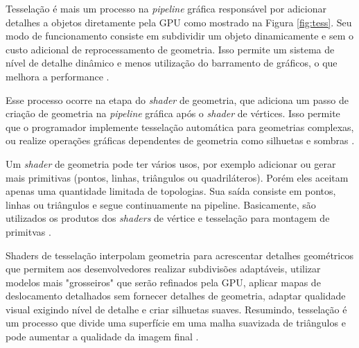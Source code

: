 Tesselação é mais um processo na \textit{pipeline} gráfica responsável por adicionar detalhes a objetos diretamente pela GPU como mostrado na Figura \ref{fig:tess}. Seu modo de funcionamento consiste em subdividir um objeto dinamicamente e sem o custo adicional de reprocessamento de geometria. Isso permite um sistema de nível de detalhe dinâmico e menos utilização do barramento de gráficos, o que melhora a performance \cite{HLSLBook}.

\begin{figure}[h!]
	\centering
\end{figure}
\nocite{tesselation}

Esse processo ocorre na etapa do \textit{shader} de geometria, que adiciona um passo de criação de geometria na \textit{pipeline} gráfica após o \textit{shader} de vértices. Isso permite que o programador implemente tesselação automática para geometrias complexas, ou realize operações gráficas dependentes de geometria como silhuetas e sombras \cite{bailey2007}.

Um \textit{shader} de geometria pode ter vários usos, por exemplo adicionar ou gerar mais primitivas (pontos, linhas, triângulos ou quadriláteros). Porém eles aceitam apenas uma quantidade limitada de topologias. Sua saída consiste em pontos, linhas ou triângulos e segue continuamente na pipeline. Basicamente, são utilizados os produtos dos \textit{shaders} de vértice e tesselação para montagem de primitvas \cite{hasu2018modern}.  

Shaders de tesselação interpolam geometria para acrescentar detalhes geométricos que permitem aos desenvolvedores realizar subdivisões adaptáveis, utilizar modelos mais "grosseiros" que serão refinados pela GPU, aplicar mapas de deslocamento detalhados sem fornecer detalhes de geometria, adaptar qualidade visual exigindo nível de detalhe e criar silhuetas suaves. Resumindo, tesselação é um processo que divide uma superfície em uma malha suavizada de triângulos e pode aumentar a qualidade da imagem final \cite{hasu2018modern}.

